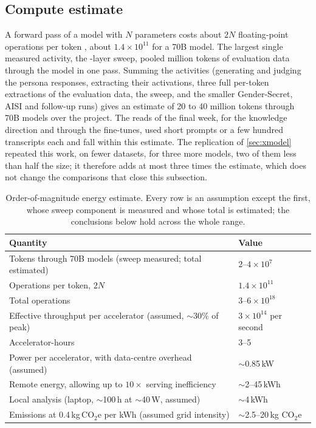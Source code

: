\subsection{Compute estimate}

A forward pass of a model with $N$ parameters costs about $2N$ floating-point operations per token
\cite{kaplan2020scaling}, about $1.4 \times 10^{11}$ for a 70B model. The largest single measured
activity, the -layer sweep, pooled  million tokens of evaluation data
through the model in one pass. Summing the activities (generating and judging the
 persona responses, extracting their activations, three full per-token extractions
of the evaluation data, the sweep, and the smaller Gender-Secret, AISI and follow-up runs) gives an
estimate of 20 to 40 million tokens through 70B models over the project. The reads of the final week,
for the knowledge direction and through the fine-tunes, used short prompts or a few hundred
transcripts each and fall within this estimate. The replication of \cref{sec:xmodel} repeated this
work, on fewer datasets, for three more models, two of them less than half the size; it therefore adds
at most three times the estimate, which does not change the comparisons that close this subsection.

\begin{table}[t]
\centering
\small
\caption{Order-of-magnitude energy estimate. Every row is an assumption except the first, whose sweep
component is measured and whose total is estimated; the conclusions below hold across the whole range.}
\label{tab:energy}
\begin{tabular}{@{}l l@{}}
\toprule
Quantity & Value \\
\midrule
Tokens through 70B models (sweep measured; total estimated) & $2$--$4 \times 10^{7}$ \\
Operations per token, $2N$ \cite{kaplan2020scaling} & $1.4 \times 10^{11}$ \\
Total operations & $3$--$6 \times 10^{18}$ \\
Effective throughput per accelerator (assumed, $\sim$30\% of peak) & $3 \times 10^{14}$ per second \\
Accelerator-hours & 3--5 \\
Power per accelerator, with data-centre overhead (assumed) & $\sim$0.85\,kW \\
Remote energy, allowing up to $10\times$ serving inefficiency & $\sim$2--45\,kWh \\
Local analysis (laptop, $\sim$100\,h at $\sim$40\,W, assumed) & $\sim$4\,kWh \\
Emissions at 0.4\,kg\,CO$_2$e per kWh (assumed grid intensity) & $\sim$2.5--20\,kg CO$_2$e \\
\bottomrule
\end{tabular}
\end{table}


